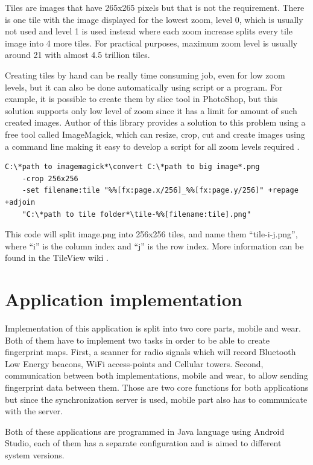 Tiles are images that have 265x265 pixels but that is not the requirement. There is one tile with the image displayed for the lowest zoom, level 0, which is usually not used and level 1 is used instead where each zoom increase splits every tile image into 4 more tiles. For practical purposes, maximum zoom level is usually around 21 with almost 4.5 trillion tiles.

Creating tiles by hand can be really time consuming job, even for low zoom levels, but it can also be done automatically using script or a program. For example, it is possible to create them by slice tool in PhotoShop, but this solution supports only low level of zoom since it has a limit for amount of such created images. Author of this library provides a solution to this problem using a free tool called ImageMagick, which can resize, crop, cut and create images using a command line making it easy to develop a script for all zoom levels required \cite{TileView}.

\begin{lstlisting}[caption=Creating tiles using ImageMagick]
C:\*path to imagemagick*\convert C:\*path to big image*.png 
	-crop 256x256 
	-set filename:tile "%%[fx:page.x/256]_%%[fx:page.y/256]" +repage +adjoin 
	"C:\*path to tile folder*\tile-%%[filename:tile].png"
\end{lstlisting}

This code will split image.png into 256x256 tiles, and name them \enquote{tile-i-j.png}, where \enquote{i} is the column index and \enquote{j} is the row index. More information can be found in the TileView wiki \cite{TileViewWiki}.

\section{Application implementation}\label{sec:ApplicationImplementation}
Implementation of this application is split into two core parts, mobile and wear. Both of them have to implement two tasks in order to be able to create fingerprint maps. First, a scanner for radio signals which will record Bluetooth Low Energy beacons, WiFi access-points and Cellular towers. Second, communication between both implementations, mobile and wear, to allow sending fingerprint data between them. Those are two core functions for both applications but since the synchronization server is used, mobile part also has to communicate with the server.

Both of these applications are programmed in Java language using Android Studio, each of them has a separate configuration and is aimed to different system versions.

